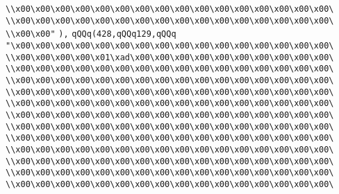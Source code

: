 \verb|\\x00\x00\x00\x00\x00\x00\x00\x00\x00\x00\x00\x00\x00\x00\x00\x00\|\newline
\verb|\\x00\x00\x00\x00\x00\x00\x00\x00\x00\x00\x00\x00\x00\x00\x00\x00\|\newline
\verb|\\x00\x00"|\newline
\verb|),|\newline
\verb|qQQq(428,qQQq129,qQQq|\newline
\verb|"\x00\x00\x00\x00\x00\x00\x00\x00\x00\x00\x00\x00\x00\x00\x00\x00\|\newline
\verb|\\x00\x00\x00\x00\x01\xad\x00\x00\x00\x00\x00\x00\x00\x00\x00\x00\|\newline
\verb|\\x00\x00\x00\x00\x00\x00\x00\x00\x00\x00\x00\x00\x00\x00\x00\x00\|\newline
\verb|\\x00\x00\x00\x00\x00\x00\x00\x00\x00\x00\x00\x00\x00\x00\x00\x00\|\newline
\verb|\\x00\x00\x00\x00\x00\x00\x00\x00\x00\x00\x00\x00\x00\x00\x00\x00\|\newline
\verb|\\x00\x00\x00\x00\x00\x00\x00\x00\x00\x00\x00\x00\x00\x00\x00\x00\|\newline
\verb|\\x00\x00\x00\x00\x00\x00\x00\x00\x00\x00\x00\x00\x00\x00\x00\x00\|\newline
\verb|\\x00\x00\x00\x00\x00\x00\x00\x00\x00\x00\x00\x00\x00\x00\x00\x00\|\newline
\verb|\\x00\x00\x00\x00\x00\x00\x00\x00\x00\x00\x00\x00\x00\x00\x00\x00\|\newline
\verb|\\x00\x00\x00\x00\x00\x00\x00\x00\x00\x00\x00\x00\x00\x00\x00\x00\|\newline
\verb|\\x00\x00\x00\x00\x00\x00\x00\x00\x00\x00\x00\x00\x00\x00\x00\x00\|\newline
\verb|\\x00\x00\x00\x00\x00\x00\x00\x00\x00\x00\x00\x00\x00\x00\x00\x00\|\newline
\verb|\\x00\x00\x00\x00\x00\x00\x00\x00\x00\x00\x00\x00\x00\x00\x00\x00\|\newline
